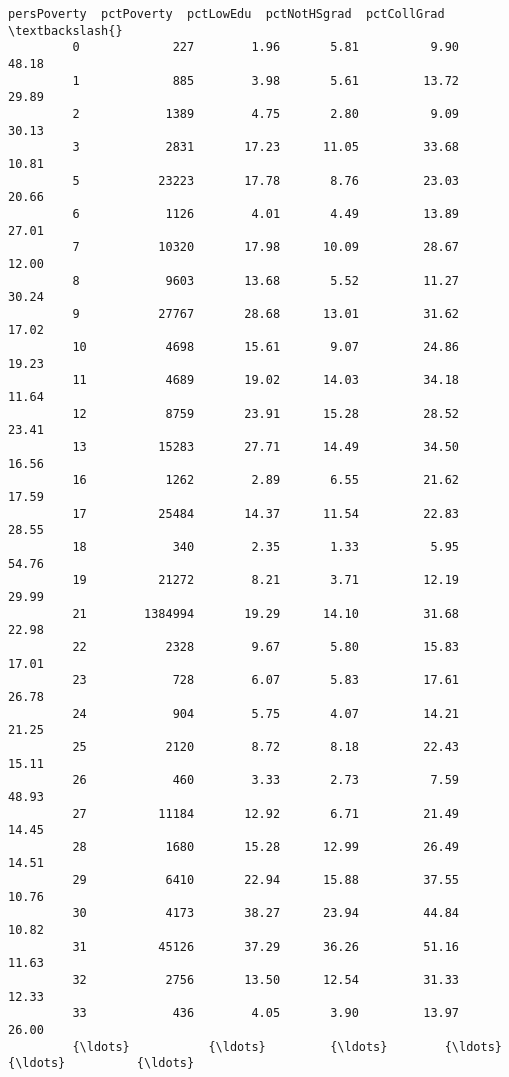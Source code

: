 \documentclass[11pt]{llncs}
\begin{document}
\begin{Verbatim}[commandchars=\\\{\}]
               persPoverty  pctPoverty  pctLowEdu  pctNotHSgrad  pctCollGrad  \textbackslash{}
         0             227        1.96       5.81          9.90        48.18   
         1             885        3.98       5.61         13.72        29.89   
         2            1389        4.75       2.80          9.09        30.13   
         3            2831       17.23      11.05         33.68        10.81   
         5           23223       17.78       8.76         23.03        20.66   
         6            1126        4.01       4.49         13.89        27.01   
         7           10320       17.98      10.09         28.67        12.00   
         8            9603       13.68       5.52         11.27        30.24   
         9           27767       28.68      13.01         31.62        17.02   
         10           4698       15.61       9.07         24.86        19.23   
         11           4689       19.02      14.03         34.18        11.64   
         12           8759       23.91      15.28         28.52        23.41   
         13          15283       27.71      14.49         34.50        16.56   
         16           1262        2.89       6.55         21.62        17.59   
         17          25484       14.37      11.54         22.83        28.55   
         18            340        2.35       1.33          5.95        54.76   
         19          21272        8.21       3.71         12.19        29.99   
         21        1384994       19.29      14.10         31.68        22.98   
         22           2328        9.67       5.80         15.83        17.01   
         23            728        6.07       5.83         17.61        26.78   
         24            904        5.75       4.07         14.21        21.25   
         25           2120        8.72       8.18         22.43        15.11   
         26            460        3.33       2.73          7.59        48.93   
         27          11184       12.92       6.71         21.49        14.45   
         28           1680       15.28      12.99         26.49        14.51   
         29           6410       22.94      15.88         37.55        10.76   
         30           4173       38.27      23.94         44.84        10.82   
         31          45126       37.29      36.26         51.16        11.63   
         32           2756       13.50      12.54         31.33        12.33   
         33            436        4.05       3.90         13.97        26.00   
         {\ldots}           {\ldots}         {\ldots}        {\ldots}           {\ldots}          {\ldots}   

\end{Verbatim}
\end{document}
